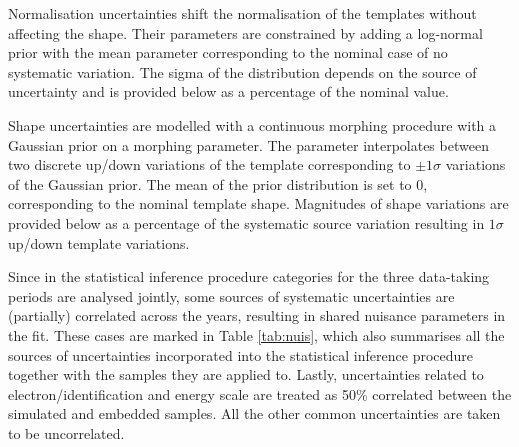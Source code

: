 Normalisation uncertainties shift the normalisation of the templates without affecting the shape. Their parameters are constrained by adding a log-normal prior with the mean parameter corresponding to the nominal case of no systematic variation. The sigma of the distribution depends on the source of uncertainty and is provided below as a percentage of the nominal value. 

Shape uncertainties are modelled with a continuous morphing procedure with a Gaussian prior on a morphing parameter. The parameter interpolates between two discrete up/down variations of the template corresponding to $\pm 1\sigma$ variations of the Gaussian prior. The mean of the prior distribution is set to 0, corresponding to the nominal template shape. Magnitudes of shape variations are provided below as a percentage of the systematic source variation resulting in $1\sigma$ up/down template variations. 

Since in the statistical inference procedure categories for the three data-taking periods are analysed jointly, some sources of systematic uncertainties are (partially) correlated across the years, resulting in shared nuisance parameters in the fit. These cases are marked in Table \ref{tab:nuis}, which also summarises all the sources of uncertainties incorporated into the statistical inference procedure together with the samples they are applied to. Lastly, uncertainties related to electron/\tauh identification and energy scale are treated as 50\% correlated between the simulated and embedded samples. All the other common uncertainties are taken to be uncorrelated.

